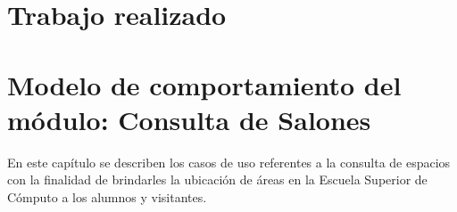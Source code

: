\documentclass[10pt]{book}
\begin{document}
%    
\chapter{Trabajo realizado}\label{chp:modeloComportamiento}

\chapter{Modelo de comportamiento del módulo: Consulta de Salones \label{chp:modeloComportamientoProfesores}}
En este capítulo se describen los casos de uso referentes a la consulta de espacios con la finalidad de brindarles la ubicación de áreas en la Escuela Superior de Cómputo a los alumnos y visitantes. \bigskip
\end{document}

